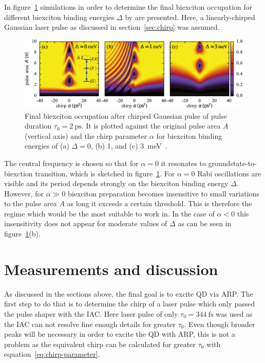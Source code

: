In figure~\ref{fig:biexciton-occupation} simulations in order to determine the final biexciton occupation for different biexciton binding energies $\Delta$ by \textcite{glassl_biexciton_2013} are presented.
Here, a linearly-chirped Gaussian laser pulse as discussed in section~\ref{sec:chirp} was assumed.
\begin{figure}[H]
	\centering
	\includegraphics[width=\linewidth]{figures/chirp/biexciton-occupation}
	\caption[Final biexciton occupation after chirped Gaussian pulse of pulse duration $\tau_0 = \SI{2}{\pico \second}$]{Final biexciton occupation after chirped Gaussian pulse of pulse duration $\tau_0 = \SI{2}{\pico \second}$.
		It is plotted against the original pulse area $A$ (vertical axis) and the chirp parameter $\alpha$ for biexciton binding energies of (a) $\Delta=0$, (b) 1, and (c) \SI{3}{\milli \electronvolt}~\cite{glassl_biexciton_2013}.}
	\label{fig:biexciton-occupation}
\end{figure}
The central frequency is chosen so that for $\alpha=0$ it resonates to groundstate-to-biexction transition, which is sketched in figure~\ref{fig:biexciton-occupation}.
For $\alpha=0$ Rabi oscillations are visible and its period depends strongly on the biexciton binding energy $\Delta$.
However, for $\alpha \gg 0$ biexciton preparation becomes insensitive to small variations to the pulse area $A$ as long it exceeds a certain threshold.
This is therefore the regime which would be the most suitable to work in.
In the case of $\alpha < 0$ this insensitivity does not appear for moderate values of $\Delta$ as can be seen in figure~\ref{fig:biexciton-occupation}(b).

\newpage
\section{Measurements and discussion}
As discussed in the sections above, the final goal is to excite \ac{QD} via \ac{ARP}.
The first step to do that is to determine the chirp of a laser pulse which only passed the pulse shaper with the \ac{IAC}.
Here laser pulse of only $\tau_0=\SI{344}{\femto \second}$ was used as the \ac{IAC} can not resolve fine enough details for greater $\tau_0$.
Even though broader peaks will be necessary in order to excite the \ac{QD} with \ac{ARP}, this is not a problem as the equivalent chirp can be calculated for greater $\tau_0$ with equation~\eqref{eq:chirp-parameter}.

